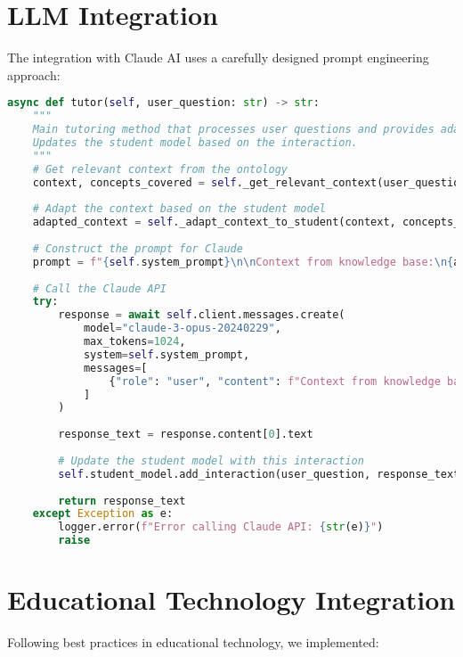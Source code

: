 \section{LLM Integration}
\label{sec:llm-integration}

The integration with Claude AI uses a carefully designed prompt engineering approach:

\begin{lstlisting}[language=Python, caption=LLM Integration, label=lst:llm-integration]
async def tutor(self, user_question: str) -> str:
    """
    Main tutoring method that processes user questions and provides adaptive responses.
    Updates the student model based on the interaction.
    """
    # Get relevant context from the ontology
    context, concepts_covered = self._get_relevant_context(user_question)
    
    # Adapt the context based on the student model
    adapted_context = self._adapt_context_to_student(context, concepts_covered)
    
    # Construct the prompt for Claude
    prompt = f"{self.system_prompt}\n\nContext from knowledge base:\n{adapted_context}\n\nStudent question: {user_question}\n\nProvide a helpful, accurate, and educational response:"
    
    # Call the Claude API
    try:
        response = await self.client.messages.create(
            model="claude-3-opus-20240229",
            max_tokens=1024,
            system=self.system_prompt,
            messages=[
                {"role": "user", "content": f"Context from knowledge base:\n{adapted_context}\n\nStudent question: {user_question}"}
            ]
        )
        
        response_text = response.content[0].text
        
        # Update the student model with this interaction
        self.student_model.add_interaction(user_question, response_text, concepts_covered)
        
        return response_text
    except Exception as e:
        logger.error(f"Error calling Claude API: {str(e)}")
        raise
\end{lstlisting}

\section{Educational Technology Integration}
\label{sec:ed-tech}

Following best practices in educational technology, we implemented:


